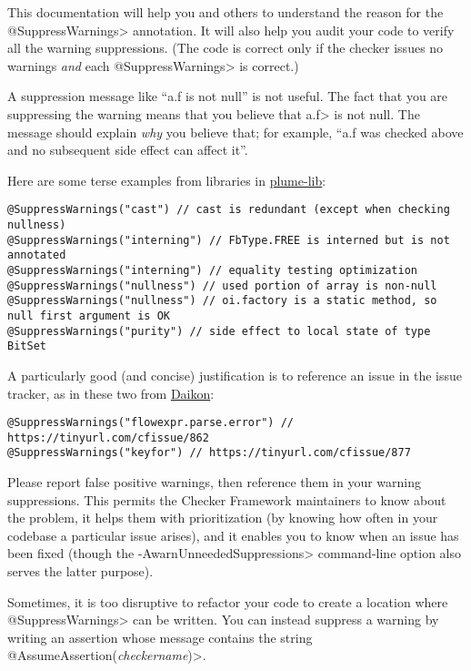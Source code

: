 This documentation will help you and others to understand the reason for
the \<@SuppressWarnings> annotation.  It will also help you audit your code
to verify all the warning suppressions.  (The code is correct only if the
checker issues no warnings \emph{and} each \<@SuppressWarnings> is correct.)

A suppression message like ``a.f is not null'' is not useful.  The fact
that you are suppressing the warning means that you believe that \<a.f> is
not null.  The message should explain \emph{why} you believe that; for
example, ``a.f was checked above and no subsequent side effect can affect it''.

Here are some terse examples from libraries in \href{https://github.com/plume-lib/}{plume-lib}:

\begin{Verbatim}
@SuppressWarnings("cast") // cast is redundant (except when checking nullness)
@SuppressWarnings("interning") // FbType.FREE is interned but is not annotated
@SuppressWarnings("interning") // equality testing optimization
@SuppressWarnings("nullness") // used portion of array is non-null
@SuppressWarnings("nullness") // oi.factory is a static method, so null first argument is OK
@SuppressWarnings("purity") // side effect to local state of type BitSet
\end{Verbatim}

A particularly good (and concise) justification is to reference an issue in
the issue tracker, as in these two from \href{https://plse.cs.washington.edu/daikon/}{Daikon}:

\begin{Verbatim}
@SuppressWarnings("flowexpr.parse.error") // https://tinyurl.com/cfissue/862
@SuppressWarnings("keyfor") // https://tinyurl.com/cfissue/877
\end{Verbatim}

\noindent
Please report false positive warnings, then reference them in your warning suppressions.
This permits the Checker Framework maintainers to know about the
problem, it helps them with prioritization (by knowing how often in your
codebase a particular issue arises), and it enables you to know when an
issue has been fixed (though the \<-AwarnUnneededSuppressions> command-line
option also serves the latter purpose).



\begin{sloppypar}
Sometimes, it is too disruptive to refactor your code to create a location
where \<@SuppressWarnings> can be written.  You can instead suppress a
warning by writing an assertion whose message contains the string
\<@AssumeAssertion(\emph{checkername})>.
\end{sloppypar}


